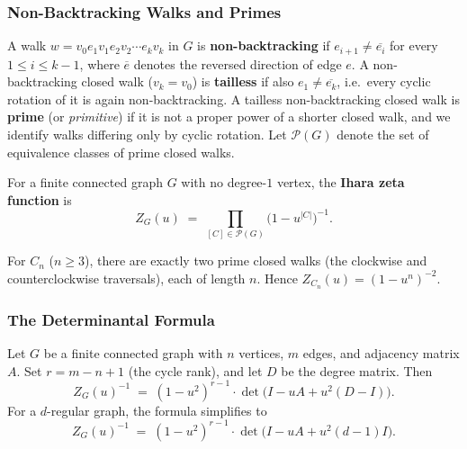 \subsubsection{Non-Backtracking Walks and Primes}

\begin{definition}
A walk $w = v_0 e_1 v_1 e_2 v_2 \cdots e_k v_k$ in $G$ is
\textbf{non-backtracking} if $e_{i+1} \ne \overline{e_i}$ for every
$1 \le i \le k - 1$, where $\overline{e}$ denotes the reversed direction
of edge $e$. A non-backtracking closed walk ($v_k = v_0$) is
\textbf{tailless} if also $e_1 \ne \overline{e_k}$, i.e.\ every cyclic
rotation of it is again non-backtracking. A tailless non-backtracking
closed walk is \textbf{prime} (or \emph{primitive})
if it is not a proper power of a shorter closed walk, and we identify
walks differing only by cyclic rotation. Let $\mathcal P(G)$ denote
the set of equivalence classes of prime closed walks.
\end{definition}

\begin{definition}\label{def:ihara}
For a finite connected graph $G$ with no degree-$1$ vertex, the
\textbf{Ihara zeta function} is
\[
  Z_G(u) \;=\; \prod_{[C] \in \mathcal P(G)} \big(1 - u^{|C|}\big)^{-1}.
\]
\end{definition}

\begin{example}
For $C_n$ ($n \ge 3$), there are exactly two prime closed walks (the
clockwise and counterclockwise traversals), each of length $n$. Hence
$Z_{C_n}(u) = (1 - u^n)^{-2}$.
\end{example}

\subsubsection{The Determinantal Formula}

\begin{theorem}\label{thm:iharabass}
Let $G$ be a finite connected graph with $n$ vertices, $m$ edges, and
adjacency matrix $A$. Set $r = m - n + 1$ (the cycle rank), and let
$D$ be the degree matrix. Then
\[
  Z_G(u)^{-1} \;=\; (1 - u^2)^{r - 1} \cdot \det\!\big(I - u A + u^2 (D - I)\big).
\]
For a $d$-regular graph, the formula simplifies to
\[
  Z_G(u)^{-1} \;=\; (1 - u^2)^{r - 1} \cdot \det\!\big(I - u A + u^2 (d - 1) I\big).
\]
\end{theorem}

